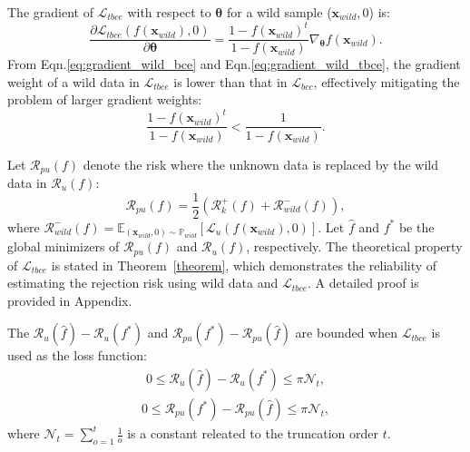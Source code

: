 The gradient of $\mathcal{L}_{tbce}$ with respect to $\boldsymbol{\theta}$ for a wild sample ($\boldsymbol{x}_{wild},0$) is:
\begin{equation}
    \frac{\partial \mathcal{L}_{tbce}(f(\boldsymbol{x}_{wild}),0)}{\partial \boldsymbol{\theta}}={\frac{1-f(\boldsymbol{x}_{wild})^{t}}{1-f(\boldsymbol{x}_{wild})}}\nabla_{\boldsymbol{\theta}}f(\boldsymbol{x}_{wild}).
    \label{eq:gradient_wild_tbce}
\end{equation}
From Eqn.\ref{eq:gradient_wild_bce} and Eqn.\ref{eq:gradient_wild_tbce}, the gradient weight of a wild data in $\mathcal{L}_{tbce}$ is lower than that in $\mathcal{L}_{bcc}$, effectively mitigating the problem of larger gradient weights:
\begin{equation}
    {\frac{1-f(\boldsymbol{x}_{wild})^{t}}{1-f(\boldsymbol{x}_{wild})}} < {\frac{1}{1-f(\boldsymbol{x}_{wild})}}.
\end{equation}

Let $\mathcal{R}_{pu}(f)$ denote the risk where the unknown data is replaced by the wild data in $\mathcal{R}_{u}(f)$:
\begin{equation}
    \mathcal{R}_{pu}(f)=\frac{1}{2}\left(\mathcal{R}^{+}_{k}(f)+\mathcal{R}^{-}_{wild}(f)\right),
    \label{eq:unknown_classes_risk_pu}
\end{equation}
where $\mathcal{R}^{-}_{wild}(f)=\mathbb{E}_{(\boldsymbol{x}_{wild},0){\sim}{\mathbb{P}_{wild}}}\left[\mathcal{L}_{u}(f(\boldsymbol{x}_{wild}),0)\right]$. Let $\hat{f}$ and $f^{*}$ be the global minimizers of $\mathcal{R}_{pu}(f)$ and $\mathcal{R}_{u}(f)$, respectively. The theoretical property of $\mathcal{L}_{tbce}$ is stated in Theorem~\ref{theorem}, which demonstrates the reliability of estimating the rejection risk using wild data and $\mathcal{L}_{tbce}$. A detailed proof is provided in Appendix.
\begin{theorem}\label{theorem}
    The $\mathcal{R}_{u}(\hat{f})-\mathcal{R}_{u}(f^{*})$ and $\mathcal{R}_{pu}(f^{*})-\mathcal{R}_{pu}(\hat{f})$ are bounded when $\mathcal{L}_{tbce}$ is used as the loss function:
    \begin{equation}
        \begin{aligned}
            0 \leq {\mathcal{R}_{u}(\hat{f})-\mathcal{R}_{u}(f^*)} \leq {\pi\mathcal{N}_t},
        \end{aligned}
    \end{equation}
    \begin{equation}
        \begin{aligned}
            0 \leq {\mathcal{R}_{pu}(f^*)-\mathcal{R}_{pu}(\hat{f})} \leq {\pi\mathcal{N}_t},
        \end{aligned}
    \end{equation}
    where $\mathcal{N}_{t}={\sum_{o=1}^{t}}\frac{1}{o}$ is a constant releated to the truncation order $t$.
\end{theorem}

